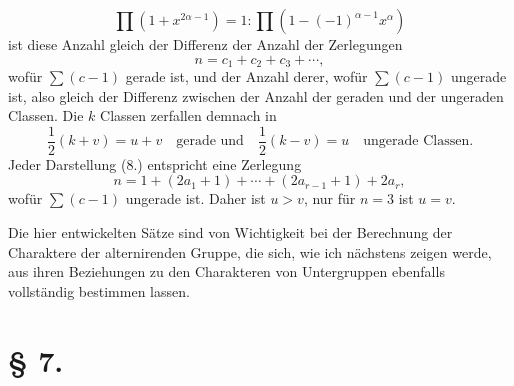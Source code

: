 \documentclass[11pt]{article}
\begin{document}
\[
 \prod(1+x^{2\alpha-1})=1:\prod(1-(-1)^{\alpha-1}x^\alpha)
\]
ist diese Anzahl gleich der Differenz der Anzahl der Zerlegungen
\begin{equation}\tag{10.}
 n=c_1+c_2+c_3+
\cdots,
\end{equation}
wofür $\sum(c-1)$ gerade ist, und der Anzahl derer, wofür $\sum(c-1)$ ungerade ist, also gleich der Differenz zwischen der Anzahl der geraden und der ungeraden Classen. Die $k$ Classen zerfallen demnach in
\begin{equation}\tag{11.}
 \frac12(k+v)=u+v\quad\text{gerade und}\quad \frac12(k-v)=u\quad\text{ungerade Classen.}
\end{equation}
Jeder Darstellung (8.) entspricht eine Zerlegung
\[
 n=1+(2a_1+1)+
\cdots+(2a_{r-1}+1)+2a_r,
\]
wofür $\sum(c-1)$ ungerade ist. Daher ist $u>v$, nur für $n=3$ ist $u=v$.

Die hier entwickelten Sätze sind von Wichtigkeit bei der Berechnung der Charaktere der alternirenden Gruppe, die sich, wie ich nächstens zeigen werde, aus ihren Beziehungen zu den Charakteren von Untergruppen ebenfalls vollständig bestimmen lassen.

\section*{§ 7.}
\end{document}
